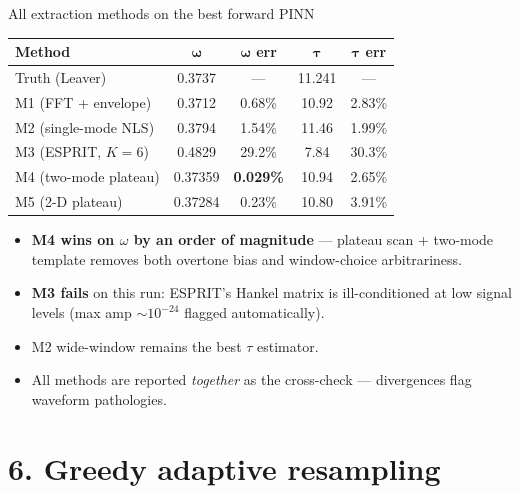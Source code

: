 \documentclass[aspectratio=169, 11pt]{beamer}
\begin{document}
\begin{frame}{All extraction methods on the best forward PINN}
  \begin{center}\footnotesize
    \begin{tabular}{@{}lcccc@{}}
      \toprule
      \textbf{Method} & $\boldsymbol{\omega}$ & $\boldsymbol{\omega}$ \textbf{err} & $\boldsymbol{\tau}$ & $\boldsymbol{\tau}$ \textbf{err} \\
      \midrule
      Truth (Leaver)         & 0.3737  & ---     & 11.241 & ---     \\
      \midrule
      M1 (FFT + envelope)    & 0.3712  & 0.68\%  & 10.92  & 2.83\%  \\
      M2 (single-mode NLS)   & 0.3794  & 1.54\%  & 11.46  & 1.99\%  \\
      M3 (ESPRIT, $K\!=\!6$) & 0.4829  & 29.2\%  & 7.84   & 30.3\%  \\
      \rowcolor{green!10}
      M4 (two-mode plateau)  & 0.37359 & \textbf{0.029\%} & 10.94  & 2.65\%  \\
      M5 (2-D plateau)       & 0.37284 & 0.23\%  & 10.80  & 3.91\%  \\
      \bottomrule
    \end{tabular}
  \end{center}
  \medskip
  \begin{itemize}\small
    \item \textbf{M4 wins on $\omega$ by an order of magnitude} ---
          plateau scan + two-mode template removes both overtone bias
          and window-choice arbitrariness.
    \item \textbf{M3 fails} on this run: ESPRIT's Hankel matrix is
          ill-conditioned at low signal levels (max amp $\sim 10^{-24}$
          flagged automatically).
    \item M2 wide-window remains the best $\tau$ estimator.
    \item All methods are reported \emph{together} as the cross-check
          --- divergences flag waveform pathologies.
  \end{itemize}
\end{frame}


\section{6. Greedy adaptive resampling}
\end{document}
